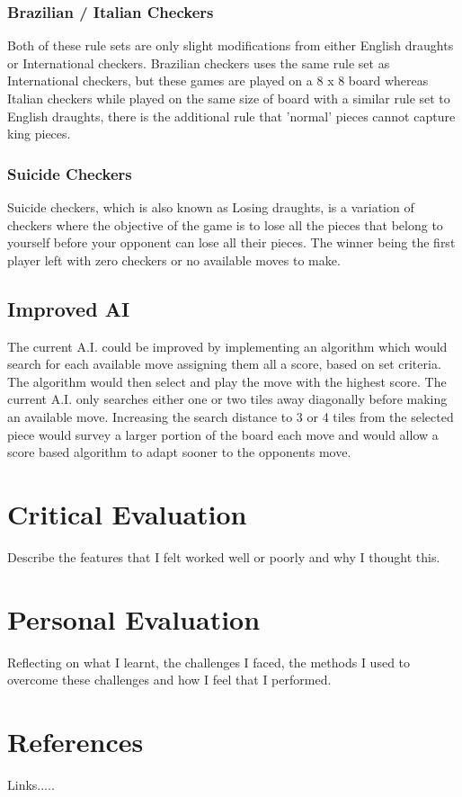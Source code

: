 \documentclass[10pt, a4paper]{article}
\begin{document}
    
    	\subsubsection{Brazilian / Italian Checkers}
   		Both of these rule sets are only slight modifications from either English draughts or International checkers. Brazilian checkers uses the same rule set as International checkers, but these games are played on a 8 x 8 board whereas Italian checkers while played on the same size of board with a similar rule set to English draughts, there is the additional rule that 'normal' pieces cannot capture king pieces.
   		
    
    	\subsubsection{Suicide Checkers}
    	Suicide checkers, which is also known as Losing draughts, is a variation of checkers where the objective of the game is to lose all the pieces that belong to yourself before your opponent can lose all their pieces. The winner being the first player left with zero checkers or no available moves to make. 
    	
    	
    \subsection{Improved AI}
    The current A.I. could be improved by implementing an algorithm which would search for each available move assigning them all a score, based on set criteria. The algorithm would then select and play the move with the highest score.    
    The current A.I. only searches either one or two tiles away diagonally before making an available move. Increasing the search distance to 3 or 4 tiles from the selected piece would survey a larger portion of the board each move and would allow a score based algorithm to adapt sooner to the opponents move. 
    
    
    
    
    
    
    
    
    
    
    
    
  
    
\section{Critical Evaluation}
Describe the features that I felt worked well or poorly and why I thought this.

    
\section{Personal Evaluation}  
Reflecting on what I learnt, the challenges I faced, the methods I used to overcome these challenges and how I feel that I performed.

   
\section{References}
Links.....
	
   
   
   
 
\end{document}
